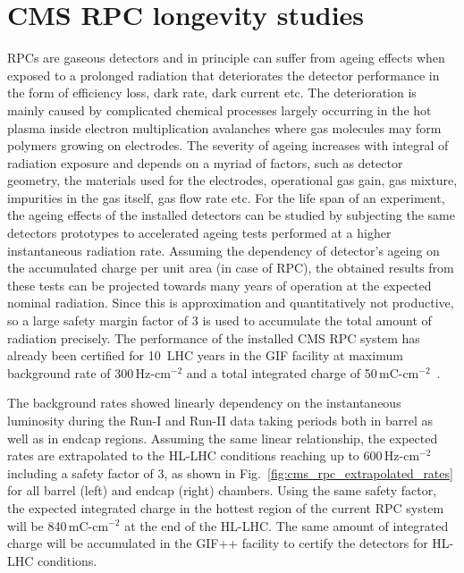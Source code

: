 \section{CMS RPC longevity studies}
RPCs are gaseous detectors and in principle can suffer from ageing effects when exposed to a prolonged radiation that deteriorates the detector performance in the form of efficiency loss, dark rate, dark current etc. The deterioration is mainly caused by complicated chemical processes largely occurring in the hot plasma inside electron multiplication avalanches where gas molecules may form polymers growing on electrodes. The severity of ageing increases with integral of radiation exposure and depends on a myriad of factors, such as detector geometry, the materials used for the electrodes, operational gas gain, gas mixture, impurities in the gas itself, gas flow rate etc. 
For the life span of an experiment, the ageing effects of the installed detectors can be studied by subjecting the same detectors prototypes to accelerated ageing tests performed at a higher instantaneous radiation rate. Assuming the dependency of detector's ageing on the accumulated charge per unit area (in case of RPC), the obtained results from these tests can be projected towards many years of operation at the expected nominal radiation. Since this is approximation and quantitatively not productive, so a large safety margin factor of 3 is used to accumulate the total amount of radiation precisely. The performance of the installed CMS RPC system has already been certified for 10~LHC years in the GIF facility at maximum background rate of 300\,Hz-cm$^{-2}$ and a total integrated charge of 50\,mC-cm$^{-2}$~\cite{ABBRESCIA2004102}.

The background rates showed linearly dependency on the instantaneous luminosity during the Run-I and Run-II data taking periods both in barrel as well as in endcap regions. Assuming the same linear relationship, the expected rates are extrapolated to the HL-LHC conditions reaching up to 600\,Hz-cm$^{-2}$ including a safety factor of 3, as shown in Fig.~\ref{fig:cms_rpc_extrapolated_rates} for all barrel (left) and endcap (right) chambers. Using the same safety factor, the expected integrated charge in the hottest region of the current RPC system will be 840\,mC-cm$^{-2}$ at the end of the HL-LHC. The same amount of integrated charge will be accumulated in the GIF++ facility to certify the detectors for HL-LHC conditions. 
  
